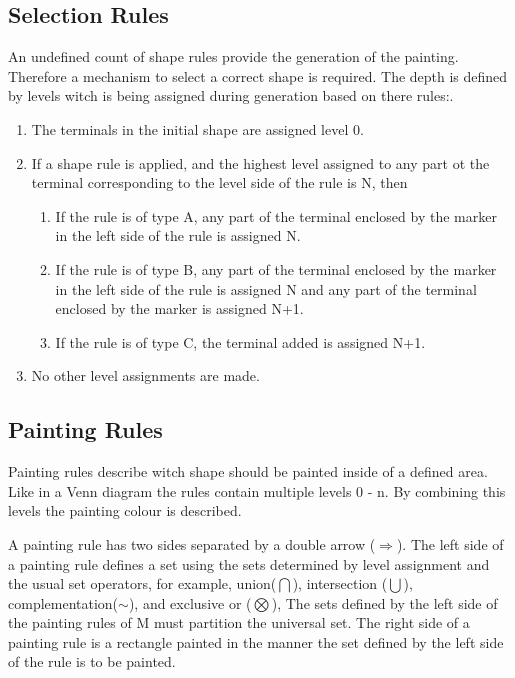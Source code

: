 \documentclass[11pt, a4paper]{report}
\begin{document}
\subsection{Selection Rules}
\label{sec:Shape_Grammar_Selection_Rules}
An undefined count of shape rules provide the generation of the painting. Therefore a mechanism to select a correct shape is required. The depth is defined by levels witch is being assigned during generation based on there rules:.\citep{shapeGrammars:1972}
\begin{displayquote}
    \begin{enumerate}
        \item The terminals in the initial shape are assigned level 0.
        \item If a shape rule is applied, and the highest level assigned to any part ot the terminal corresponding to the level side of the rule is N, then
        \begin{enumerate}
            \item If the rule is of type A, any part of the terminal enclosed by the marker in the left side of the rule is assigned N.
            \item If the rule is of type B, any part of the terminal enclosed by the marker in the left side of the rule is assigned N and any part of the terminal enclosed by the marker is assigned N+1.
            \item If the rule is of type C, the terminal added is assigned N+1.
        \end{enumerate}
        \item No other level assignments are made.
    \end{enumerate}
\end{displayquote}

\subsection{Painting Rules}
\label{sec:Shape_Grammar_Painting_Rules}
Painting rules describe witch shape should be painted inside of a defined area. Like in a Venn diagram the rules contain multiple levels 0 - n. By combining this levels the painting colour is described\citep{shapeGrammars:1972}.
\begin{displayquote}
    A painting rule has two sides separated by a double arrow ($\Rightarrow$). The left side of a painting rule defines a set using the sets determined by level assignment and the usual set operators, for example, union($\bigcap$), intersection ($\bigcup$), complementation($\sim$), and exclusive or ($\bigotimes$), The sets defined by the left side of the painting rules of M must partition the universal set. The right side of a painting rule is a rectangle painted in the manner the set defined by the left side of the rule is to be painted.
\end{displayquote}
\end{document}
